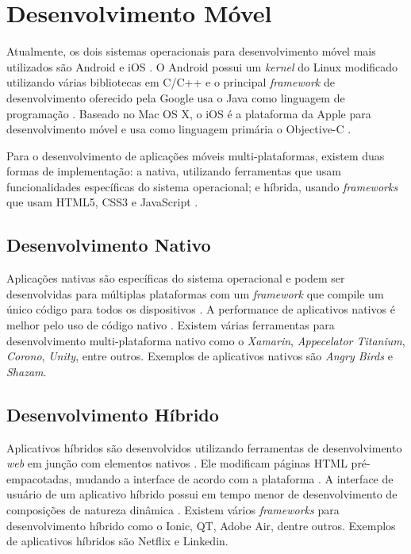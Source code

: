 \section{Desenvolvimento Móvel}

Atualmente, os dois sistemas operacionais para desenvolvimento móvel mais utilizados são Android e iOS \cite{gartner-top-os}. O Android possui um \textit{kernel} do Linux modificado utilizando várias bibliotecas em C/C++ \cite{mobile-dev} e o principal \textit{framework} de desenvolvimento oferecido pela Google usa o Java como linguagem de programação \cite{android}. Baseado no Mac OS X, o iOS é a plataforma da Apple para desenvolvimento móvel e usa como linguagem primária o Objective-C \cite{mobile-dev}. 

Para o desenvolvimento de aplicações móveis multi-plataformas, existem duas formas de implementação: a nativa, utilizando ferramentas que usam funcionalidades específicas do sistema operacional; e híbrida, usando \textit{frameworks} que usam HTML5, CSS3 e JavaScript \cite{mobile-dev-2}.

\subsection{Desenvolvimento Nativo}

Aplicações nativas são específicas do sistema operacional e podem ser desenvolvidas para múltiplas plataformas com um \textit{framework} que compile um único código para todos os dispositivos \cite{hybrid-1}. A performance de aplicativos nativos é melhor pelo uso de código nativo \cite{hybrid-2}. Existem várias ferramentas para desenvolvimento multi-plataforma nativo como o \textit{Xamarin}, \textit{Appecelator Titanium}, \textit{Corono}, \textit{Unity}, entre outros. Exemplos de aplicativos nativos são \textit{Angry Birds} e \textit{Shazam}.

\subsection{Desenvolvimento Híbrido}

Aplicativos híbridos são desenvolvidos utilizando ferramentas de desenvolvimento \textit{web} em junção com elementos nativos \cite{hybrid-1}. Ele modificam páginas HTML pré-empacotadas, mudando a interface de acordo com a plataforma \cite{hybrid-2}. A interface de usuário de um aplicativo híbrido possui em tempo menor de desenvolvimento de composições de natureza dinâmica \cite{mobile-dev-2}. Existem vários \textit{frameworks} para desenvolvimento híbrido como o Ionic, QT, Adobe Air, dentre outros. Exemplos de aplicativos híbridos são Netflix e Linkedin.
